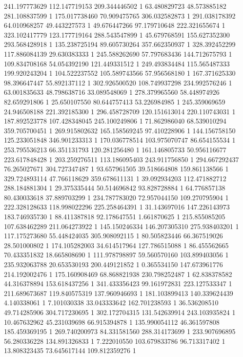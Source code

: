 241.197773629	112.147719153	209.344446502	1
63.480829723	48.573885182	281.108837599	1
175.017738460	70.909475765	306.032582873	1
291.038178392	64.010968257	49.443227573	1
49.676447266	97.179710648	222.321655674	1
323.102417779	123.177719164	288.543547899	1
45.679768591	155.627352300	293.568428918	1
135.238725194	89.605730264	357.662350937	1
328.392452299	117.886084139	29.630383333	1
245.588262690	57.797683436	144.712675793	1
109.834708168	54.054392190	121.449331512	1
249.493834484	115.565487333	199.920243204	1
104.522237552	105.589743566	57.956568180	1
167.371625330	98.396647447	55.892137112	1
302.926500520	108.749937298	234.992576246	1
63.001835633	48.798638716	33.089548069	1
278.379965560	58.448974926	82.659291806	1
25.650107550	80.644757413	53.226984985	1
245.359069659	24.946508188	221.392185300	1
296.458728709	120.151613014	220.110743031	1
187.892523778	107.428348045	245.100249806	1
71.862986040	68.539010294	359.705700451	1
269.915802632	165.158569245	97.410228906	1
144.156758150	125.233051848	346.901233313	1
170.036778514	103.975070747	86.654155534	1
253.795536213	66.351131793	120.281256480	1
161.146805733	50.956116677	223.617848428	1
203.259276511	113.186095403	243.911756850	1
294.667292437	76.265027671	304.727347487	1
93.657961505	39.518664808	159.861138566	1
329.724893114	47.766118629	359.678611131	1
39.092934203	112.471882712	288.184881304	1
29.375335444	50.514696842	93.828728884	1
64.776857138	80.430033618	37.889703299	1
234.787783020	72.957044150	109.270795904	1
222.328128633	118.998022296	225.258464391	1
31.143697016	147.226143973	183.746935730	1
88.411387818	92.178647551	1.661870625	1
215.855085205	107.638462289	211.064273922	1
145.150246334	146.207305310	275.938403201	1
117.175273680	55.448424035	305.908092115	1
80.505823446	66.367519026	28.501000802	1
174.105282003	34.614517964	127.786515088	1
86.455562665	70.433351832	18.665808690	1
111.978798897	59.560570160	103.899403056	1
235.932063788	20.653530193	200.449121852	1
0.365534150	147.673961776	214.192002476	1
175.160908469	68.868821938	230.798252487	1
62.838378582	44.316378894	153.618437256	1
341.433356423	99.161972831	223.127533347	1
211.689673687	119.840575319	137.960946693	1
181.103899413	140.339624439	4.140338061	1
7.101030338	33.043333642	162.701238593	1
36.536208510	49.714285906	304.717230695	1
302.172704315	131.542639914	243.103935824	1
10.467632962	45.231039698	66.915394878	1
135.990054112	46.361597808	185.459369195	1
269.740200973	84.331581560	288.314173699	1
233.907696895	56.280336228	134.891326833	1
7.222010550	103.679833786	96.713317402	1
13.808323435	73.645617144	109.812359276	1
